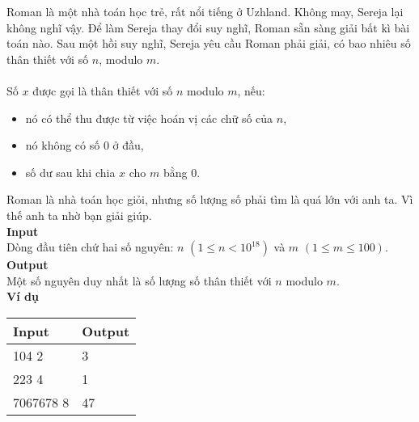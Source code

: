 Roman là một nhà toán học trẻ, rất nổi tiếng ở Uzhland. Không may, Sereja lại không nghĩ vậy. Để làm Sereja thay đổi suy nghĩ, Roman sẵn sàng giải bất kì bài toán nào. Sau một hồi suy nghĩ, Sereja yêu cầu Roman phải giải, có bao nhiêu số thân thiết với số $n$, modulo $m$.
\\
\\
Số $x$ được gọi là thân thiết với số $n$ modulo $m$, nếu:
\begin{itemize}
    \item nó có thể thu được từ việc hoán vị các chữ số của $n$,
    \item nó không có số $0$ ở đầu, 
    \item số dư sau khi chia $x$ cho $m$ bằng $0$.
\end{itemize}
Roman là nhà toán học giỏi, nhưng số lượng số phải tìm là quá lớn với anh ta. Vì thế anh ta nhờ bạn giải giúp.
\\

\textbf{Input}
\\
Dòng đầu tiên chứ hai số nguyên: $n$ $(1 \leq n < 10^{18})$ và $m$ $(1 \leq m \leq 100)$.
\\

\textbf{Output}
\\
Một số nguyên duy nhất là số lượng số thân thiết với $n$ modulo $m$.
\\

\textbf{Ví dụ}
\begin{table}[h!]
    \begin{center}
        \begin{tabular}{|p{7cm}|p{5cm}|}
            \hline
            \textbf{Input} & \textbf{Output} \\ 
            \hline
            104 2 & 3 \\
            \hline
            223 4 & 1 \\
            \hline
            7067678 8 & 47 \\
            \hline
        \end{tabular}
    \end{center}
\end{table}



